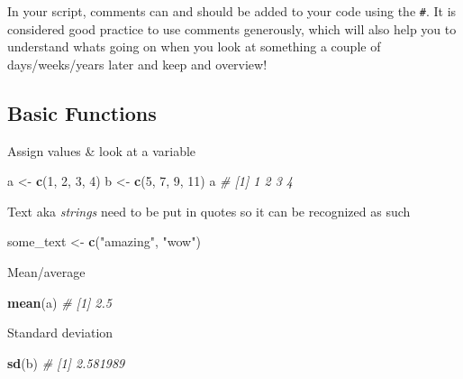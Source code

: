 \documentclass[
]{book}
\newenvironment{Shaded}{\begin{snugshade}}{\end{snugshade}}
\newcommand{\CommentTok}[1]{\textcolor[rgb]{0.56,0.35,0.01}{\textit{#1}}}
\newcommand{\DecValTok}[1]{\textcolor[rgb]{0.00,0.00,0.81}{#1}}
\newcommand{\FunctionTok}[1]{\textcolor[rgb]{0.13,0.29,0.53}{\textbf{#1}}}
\newcommand{\NormalTok}[1]{#1}
\newcommand{\OtherTok}[1]{\textcolor[rgb]{0.56,0.35,0.01}{#1}}
\newcommand{\StringTok}[1]{\textcolor[rgb]{0.31,0.60,0.02}{#1}}
\begin{document}
In your script, comments can and should be added to your code using the \texttt{\#}.
It is considered good practice to use comments generously, which will also help you to understand whats going on when you look at something a couple of days/weeks/years later and keep and overview!

\subsection*{Basic Functions}\label{basic-functions}

Assign values \& look at a variable

\begin{Shaded}
\begin{Highlighting}[]
\NormalTok{a }\OtherTok{\textless{}{-}} \FunctionTok{c}\NormalTok{(}\DecValTok{1}\NormalTok{, }\DecValTok{2}\NormalTok{, }\DecValTok{3}\NormalTok{, }\DecValTok{4}\NormalTok{)}
\NormalTok{b }\OtherTok{\textless{}{-}} \FunctionTok{c}\NormalTok{(}\DecValTok{5}\NormalTok{, }\DecValTok{7}\NormalTok{, }\DecValTok{9}\NormalTok{, }\DecValTok{11}\NormalTok{)}
\NormalTok{a}
\CommentTok{\# [1] 1 2 3 4}
\end{Highlighting}
\end{Shaded}

Text aka \emph{strings} need to be put in quotes so it can be recognized as such

\begin{Shaded}
\begin{Highlighting}[]
\NormalTok{some\_text }\OtherTok{\textless{}{-}} \FunctionTok{c}\NormalTok{(}\StringTok{"amazing"}\NormalTok{, }\StringTok{"wow"}\NormalTok{)}
\end{Highlighting}
\end{Shaded}

Mean/average

\begin{Shaded}
\begin{Highlighting}[]
\FunctionTok{mean}\NormalTok{(a)}
\CommentTok{\# [1] 2.5}
\end{Highlighting}
\end{Shaded}

Standard deviation

\begin{Shaded}
\begin{Highlighting}[]
\FunctionTok{sd}\NormalTok{(b)}
\CommentTok{\# [1] 2.581989}
\end{Highlighting}
\end{Shaded}
\end{document}
